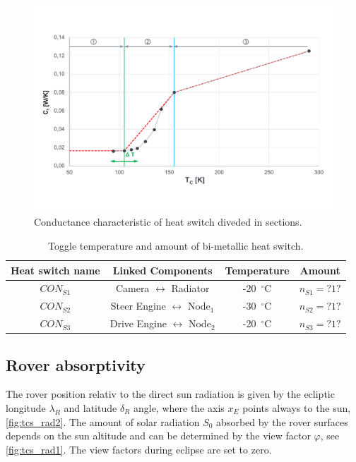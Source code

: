 \begin{figure}[H]
	\centering
	\includegraphics[width=1\textwidth]{Media/tcs_diag_section}
	\caption{Conductance characteristic of heat switch diveded in sections.}
	\label{fig:tcs_switch03}
\end{figure}


\begin{table}[H]
	\centering
	\caption{Toggle temperature and amount of bi-metallic heat switch.}
	\begin{tabular}{c@{\quad}ccc}
		\hline
		Heat switch name  & Linked Components & Temperature  & Amount \\ \hline
		 $CON_{S1}$ & {Camera} $\leftrightarrow$ {Radiator} & -20\ $^\circ$C  & $n_{S1}=?1?$  \\[1em]
		 $CON_{S2}$ & {Steer Engine} $\leftrightarrow$ {Node$_1$} & -30\ $^\circ$C  & $n_{S2}=?1?$  \\[1em]
		 $CON_{S3}$ & {Drive Engine} $\leftrightarrow$ {Node$_2$} & -20\ $^\circ$C  & $n_{S3}=?1?$  \\[1em]\hline
	\end{tabular}
	\label{tab:tcs_toggle}
\end{table}

\subsection{Rover absorptivity} \label{sec:app_therm_4}
The rover position relativ to the direct sun radiation is given by the ecliptic longitude $\lambda_R$ and latitude $\delta_R$ angle, where the axis $x_E$ points always to the sun, \autoref{fig:tcs_rad2}.
The amount of solar radiation $S_0$ absorbed by the rover surfaces depends on the sun altitude and can be determined by the view factor $\varphi$, see \autoref{fig:tcs_rad1}.
The view factors during eclipse are set to zero.


